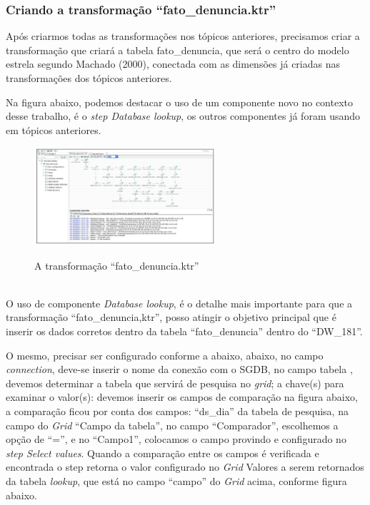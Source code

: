 \subsubsection{Criando a transforma\c{c}\~{a}o ``fato\_denuncia.ktr''}

Ap\'os criarmos todas as transforma\c{c}\~{o}es nos t\'opicos anteriores,
 precisamos criar a transforma\c{c}\~{a}o que criar\'{a} a tabela fato\_denuncia, 
 que ser\'{a} o centro do modelo estrela segundo Machado (2000), conectada com as dimens\~{o}es j\'{a} 
 criadas nas transforma\c{c}\~{o}es dos t\'opicos anteriores.

Na figura abaixo, podemos destacar o uso de um componente novo no contexto desse trabalho, \'{e} o 
\textit{step Database lookup}, os outros componentes j\'{a} foram usando em t\'opicos anteriores.

\begin{figure}[H]
	\vspace*{0,2cm}
    \centering
    \caption{A transforma\c{c}\~{a}o ``fato\_denuncia.ktr''}
    \includegraphics[width=0.6\textwidth]{./04-figuras/figura-fato}
    \label{fig:ilustfigfato}
\end{figure}
\vspace*{-0,9cm}
{\raggedright {}} \\

O uso de componente \textit{Database lookup}, \'{e} o detalhe mais importante para que a transforma\c{c}\~{a}o 
``fato\_denuncia,ktr'', posso atingir o objetivo principal que \'{e} inserir os dados corretos dentro da tabela 
``fato\_denuncia'' dentro do ``DW\_181''. 

O mesmo, precisar ser configurado conforme a abaixo, abaixo, no campo \textit{connection}, deve-se inserir o 
nome da conex\~{a}o com o SGDB, no campo tabela , devemos determinar a tabela que servir\'{a} de 
pesquisa no \textit{grid}; a chave(s) para examinar o valor(s): devemos inserir os campos de compara\c{c}\~{a}o na 
figura abaixo, a compara\c{c}\~{a}o ficou por conta dos campos: ``ds\_dia''  da tabela de pesquisa, na campo do 
\textit{Grid} ``Campo da tabela'', no campo ``Comparador'', escolhemos a op\c{c}\~{a}o de ``='', e no 
``Campo1'', colocamos o campo provindo e configurado no \textit{step Select values}. Quando a compara\c{c}\~{a}o 
entre os campos \'{e} verificada e encontrada o step retorna o valor configurado no \textit{Grid} Valores a serem 
retornados da tabela \textit{lookup}, que est\'{a} no campo ``campo'' do \textit{Grid} acima, conforme figura abaixo.

